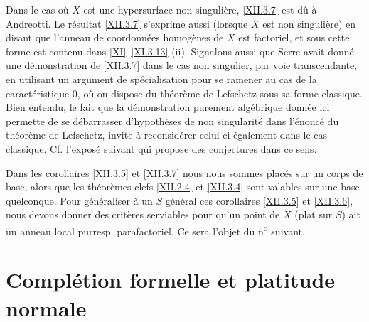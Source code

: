 \begin{remarque} \label{XII.3.8}
Dans le cas o\`u $X$ est une hypersurface non singuli\`ere, \ref{XII.3.7} est d\^u \`a Andreotti. Le r\'esultat \ref{XII.3.7} s'exprime aussi (lorsque $X$ est non singuli\`ere) en disant que l'anneau de coordonn\'ees homog\`enes de $X$ est factoriel, et sous cette forme est contenu dans \ref{XI}~\ref{XI.3.13} (ii). Signalons aussi que Serre avait donn\'e une d\'emonstration de \ref{XII.3.7} dans le cas non singulier, par voie transcendante, en utilisant un argument de sp\'ecialisation pour se ramener au cas de la caract\'eristique 0, o\`u on dispose du th\'eor\`eme de Lefschetz sous sa forme classique. Bien entendu, le fait que la d\'emonstration purement alg\'ebrique donn\'ee ici permette de se d\'ebarrasser d'hypoth\`eses de non singularit\'e dans l'\'enonc\'e du th\'eor\`eme de Lefschetz, invite \`a reconsid\'erer celui-ci \'egalement dans le cas classique. Cf. l'expos\'e suivant qui propose des conjectures dans ce sens.

Dans les corollaires \ref{XII.3.5} et \ref{XII.3.7} nous nous sommes plac\'es sur un corps de base, alors que les th\'eor\`emes-clefs \ref{XII.2.4} et \ref{XII.3.4} sont valables sur une base quelconque. Pour g\'en\'eraliser \`a un $S$ g\'en\'eral ces corollaires \ref{XII.3.5} et \ref{XII.3.6}, nous devons donner des crit\`eres serviables pour qu'un point de $X$ (plat sur $S$) ait un anneau local \og pur\fg resp. parafactoriel. Ce sera l'objet du n\textsuperscript{o} suivant.
\end{remarque}

\section{Compl\'etion formelle et platitude normale} \label{XII.4}

\setcounter{equation}{18}

